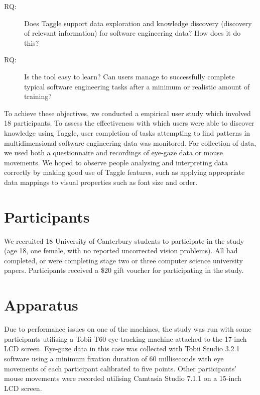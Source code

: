 \begin{description}
\item[RQ:]Does Taggle support data exploration and knowledge discovery (discovery of relevant information) for software engineering data? How does it do this?
\item[RQ:]Is the tool easy to learn? Can users manage to successfully complete typical software engineering tasks after a minimum or realistic amount of training?
\end{description}

To achieve these objectives, we conducted a empirical user study which involved 18 participants. To assess the effectiveness with which users were able to discover knowledge using Taggle, user completion of tasks attempting to find patterns in multidimensional software engineering data was monitored. For collection of data, we used both a questionnaire and recordings of eye-gaze data or mouse movements. We hoped to observe people analysing and interpreting data correctly by making good use of Taggle features, such as applying appropriate data mappings to visual properties such as font size and order.



\section{Participants}\label{sect:exp3participants}
We recruited 18 University of Canterbury students to participate in the study (age 18, one female, with no reported uncorrected vision problems). All had completed, or were completing stage two or three computer science university papers.  Participants received a \$20 gift voucher for participating in the study.

\section{Apparatus}
Due to performance issues on one of the machines, the study was run with some participants utilising a Tobii T60 eye-tracking machine attached to the 17-inch LCD screen. Eye-gaze data in this case was collected with Tobii Studio 3.2.1 software using a minimum fixation duration of 60 milliseconds with eye movements of each participant calibrated to five points.  Other participants' mouse movements were recorded utilising Camtasia Studio 7.1.1 on a 15-inch LCD screen. 


